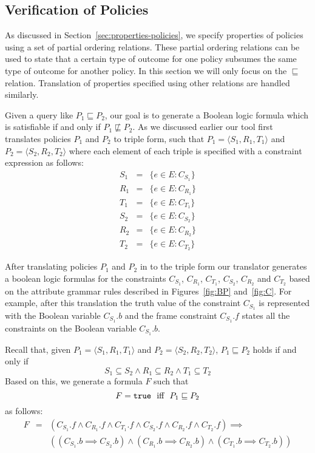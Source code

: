 \subsection{Verification of Policies}

As discussed in Section~\ref{sec:properties-policies}, we specify
properties of policies using a set of partial ordering relations.
These partial ordering relations can be used to state that a certain
type of outcome for one policy subsumes the same type of outcome for
another policy.  In this section we will only focus on the
$\sqsubseteq$ relation.  Translation of properties specified using
other relations are handled similarly.

Given a query like $P_1 \sqsubseteq P_2$, our goal is to generate a
Boolean logic formula which is satisfiable if and only if $P_1 \not
\sqsubseteq P_2$.  As we discussed earlier our tool first translates
policies $P_1$ and $P_2$ to triple form, such that $P_1 = \langle S_1,
R_1, T_1 \rangle$ and $P_2 = \langle S_2, R_2, T_2 \rangle$ where each
element of each triple is specified with a constraint expression as
follows:
\begin{eqnarray*}
S_1  & = & \{ e \in E : C_{S_1} \} \\
R_1  & = & \{ e \in E : C_{R_1} \} \\
T_1  & = & \{ e \in E : C_{T_1} \} \\
S_2  & = & \{ e \in E : C_{S_2} \} \\
R_2  & = & \{ e \in E : C_{R_2} \} \\
T_2  & = & \{ e \in E : C_{T_2} \}
\end{eqnarray*}

After translating policies $P_1$ and $P_2$ in to the triple form our
translator generates a boolean logic formulas for the constraints
$C_{S_1}$, $C_{R_1}$, $C_{T_1}$, $C_{S_2}$, $C_{R_2}$ and $C_{T_2}$
based on the attribute grammar rules described in Figures~\ref{fig:BP}
and~\ref{fig:C}.  For example, after this translation the truth value
of the constraint $C_{S_1}$ is represented with the Boolean variable
$C_{S_1}.b$ and the frame constraint $C_{S_1}.f$ states all the
constraints on the Boolean variable $C_{S_1}.b$.

Recall that, given $P_1 = \langle S_1, R_1, T_1 \rangle$ and $P_2 =
\langle S_2, R_2, T_2 \rangle$, $P_1 \sqsubseteq P_2$ holds if and
only if
\[
  S_1 \subseteq S_2
  \wedge R_1 \subseteq R_2 \wedge T_1 \subseteq T_2
\]
Based on this, we generate a formula $F$ such that 
\[
F = \texttt{true} \ \text{ iff } \ P_1 \sqsubseteq P_2
\]
as follows:
\begin{eqnarray*}
F & = & (C_{S_1}.f \wedge C_{R_1}.f \wedge C_{T_1}.f \wedge 
    C_{S_2}.f \wedge C_{R_2}.f \wedge C_{T_2}.f ) \implies \\
  & &   ((C_{S_1}.b \implies C_{S_2}.b) \wedge (C_{R_1}.b \implies C_{R_2}.b)
    \wedge (C_{T_1}.b \implies C_{T_2}.b))
\end{eqnarray*}

